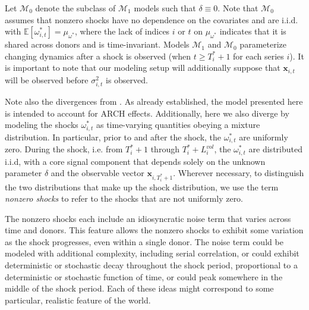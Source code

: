 \documentclass{uiucthesis2021}
\newcommand{\x}{\textbf{x}}
\def\mc#1{\mathcal{#1}} %
\def\E{\mathbb{E}} %
\def\mc#1{\mathcal{#1}}
\theoremstyle{definition}
\begin{document}
    Let $\mc{M}_{0}$ denote the subclass of $\mc{M}_{1}$ models such that $\delta \equiv 0$.  Note that $\mc{M}_{0}$ assumes that nonzero shocks have no dependence on the covariates and are i.i.d. with $\E[ \omega^{*}_{i,t}]=\mu_{\omega^{*}}$, where the lack of indices $i$ or $t$ on $\mu_{\omega^{*}}$ indicates that it is shared across donors and is time-invariant. Models $\mc{M}_{1}$ and $\mc{M}_{0}$ parameterize changing dynamics after a shock is observed (when $t \geq T_i^*+1$ for each series $i$). It is important to note that our modeling setup will additionally suppose that $\x_{i,t}$ will be observed before $\sigma_{i,t}^2$ is observed. 
    
Note also the divergences from \cite{lin2021minimizing}.  As already established, the model presented here is intended to account for ARCH effects.  Additionally, here we also diverge by modeling the shocks $\omega^{*}_{i,t}$ as time-varying quantities obeying a mixture distribution.  In particular, prior to and after the shock, the  $\omega^{*}_{i,t}$  are uniformly zero.  During the shock, i.e. from $T^{*}_{i}+1$ through $T^{*}_{i}+L^{vol}_{i}$, the $\omega^{*}_{i,t}$ are distributed i.i.d, with a core signal component that depends solely on the unknown parameter $\delta$ and the observable vector $\x_{i,T_{i}^{*}+1}$.  Wherever necessary, to distinguish the two distributions that make up the shock distribution, we use the term \textit{nonzero shocks} to refer to the shocks that are not uniformly zero.  

The nonzero shocks each include an idiosyncratic noise term that varies across time and donors.  This feature allows the nonzero shocks to exhibit some variation as the shock progresses, even within a single donor.  The noise term could be modeled with additional complexity, including serial correlation, or could exhibit deterministic or stochastic decay throughout the shock period, proportional to a deterministic or stochastic function of time, or could peak somewhere in the middle of the shock period.  Each of these ideas might correspond to some particular, realistic feature of the world.
\end{document}
